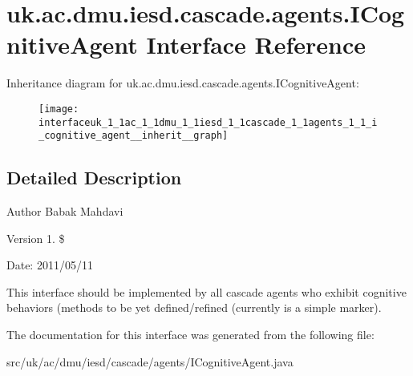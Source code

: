 \hypertarget{interfaceuk_1_1ac_1_1dmu_1_1iesd_1_1cascade_1_1agents_1_1_i_cognitive_agent}{\section{uk.\-ac.\-dmu.\-iesd.\-cascade.\-agents.\-I\-Cognitive\-Agent Interface Reference}
\label{interfaceuk_1_1ac_1_1dmu_1_1iesd_1_1cascade_1_1agents_1_1_i_cognitive_agent}
}


Inheritance diagram for uk.\-ac.\-dmu.\-iesd.\-cascade.\-agents.\-I\-Cognitive\-Agent\-:\nopagebreak
\begin{figure}[H]
\begin{center}
\leavevmode
\texttt{[image: interfaceuk\_1\_1ac\_1\_1dmu\_1\_1iesd\_1\_1cascade\_1\_1agents\_1\_1\_i\_cognitive\_agent\_\_inherit\_\_graph]}
\end{center}
\end{figure}


\subsection{Detailed Description}
\begin{DoxyAuthor}{Author}
Babak Mahdavi 
\end{DoxyAuthor}
\begin{DoxyVersion}{Version}
1. \$ 
\end{DoxyVersion}
\begin{DoxyParagraph}{Date\-:}
2011/05/11 
\end{DoxyParagraph}


This interface should be implemented by all cascade agents who exhibit cognitive behaviors (methods to be yet defined/refined (currently is a simple marker). 

The documentation for this interface was generated from the following file\-:\begin{DoxyCompactItemize}
\item 
src/uk/ac/dmu/iesd/cascade/agents/I\-Cognitive\-Agent.\-java\end{DoxyCompactItemize}
